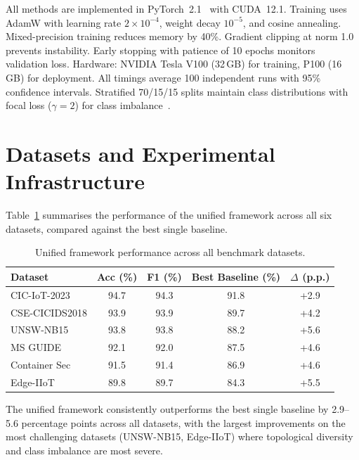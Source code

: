 All methods are implemented in PyTorch~2.1~\cite{Paszke2019} with CUDA~12.1. Training uses AdamW with learning rate $2\times10^{-4}$, weight decay $10^{-5}$, and cosine annealing. Mixed-precision training reduces memory by 40\%. Gradient clipping at norm 1.0 prevents instability. Early stopping with patience of 10 epochs monitors validation loss. Hardware: NVIDIA Tesla V100 (32\,GB) for training, P100 (16\,GB) for deployment. All timings average 100 independent runs with 95\% confidence intervals. Stratified 70/15/15 splits maintain class distributions with focal loss ($\gamma=2$) for class imbalance~\cite{Lin2017focal}.


\section{Datasets and Experimental Infrastructure}
\label{sec:benchmark_results}

Table~\ref{tab:unified_results} summarises the performance of the unified framework across all six datasets, compared against the best single baseline.

\begin{table}[htbp]
\centering
\caption{Unified framework performance across all benchmark datasets.}
\label{tab:unified_results}
\begin{tabular}{lcccc}
\toprule
\textbf{Dataset} & \textbf{Acc (\%)} & \textbf{F1 (\%)} & \textbf{Best Baseline (\%)} & \textbf{$\Delta$ (p.p.)} \\
\midrule
CIC-IoT-2023    & 94.7 & 94.3 & 91.8 & +2.9 \\
CSE-CICIDS2018   & 93.9 & 93.9 & 89.7 & +4.2 \\
UNSW-NB15        & 93.8 & 93.8 & 88.2 & +5.6 \\
MS GUIDE         & 92.1 & 92.0 & 87.5 & +4.6 \\
Container Sec    & 91.5 & 91.4 & 86.9 & +4.6 \\
Edge-IIoT        & 89.8 & 89.7 & 84.3 & +5.5 \\
\bottomrule
\end{tabular}
\end{table}

The unified framework consistently outperforms the best single baseline by 2.9--5.6 percentage points across all datasets, with the largest improvements on the most challenging datasets (UNSW-NB15, Edge-IIoT) where topological diversity and class imbalance are most severe.

